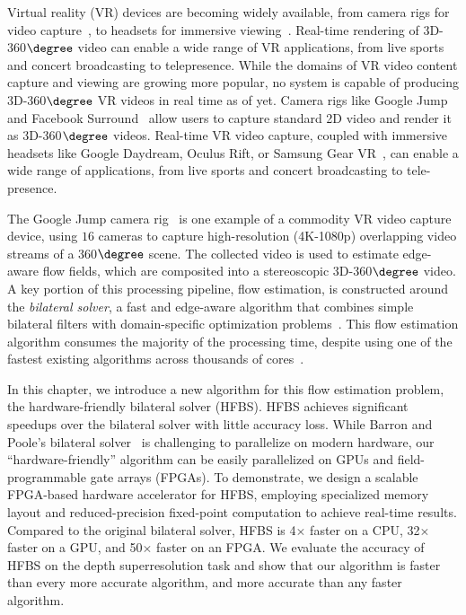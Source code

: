 Virtual reality (VR) devices are becoming widely available, from camera rigs for video capture~\cite{googlejump, facebooksurround}, to headsets for immersive viewing~\cite{oculusrift, gearvr}.
Real-time rendering of 3D-360$\degree$ video can enable a wide range of VR applications, from live sports and concert broadcasting to telepresence.
While the domains of VR video content capture and viewing are growing more popular, no system is capable of producing 3D-360$\degree$ VR videos in real time as of yet.
Camera rigs like Google Jump and Facebook Surround~\cite{googlejump} allow users to capture standard 2D video and render it as 3D-360$\degree$ videos. 
Real-time VR video capture, coupled with immersive headsets like Google Daydream, Oculus Rift, or Samsung Gear VR~\cite{googlecardboard, gearvr, oculusrift}, can enable a wide range of applications, from live sports and concert broadcasting to tele-presence.

The Google Jump camera rig~\cite{googlejump} is one example of a commodity VR video capture device, using $16$ cameras to capture high-resolution (4K-1080p) overlapping video streams of a 360$\degree$ scene. 
The collected video is used to estimate edge-aware flow fields, which are composited into a stereoscopic 3D-360$\degree$ video. 
A key portion of this processing pipeline, flow estimation, is constructed around the \emph{bilateral solver}, a fast and edge-aware algorithm that combines simple bilateral filters with domain-specific optimization problems~\cite{BarronPoole2016}. 
This flow estimation algorithm consumes the majority of the processing time, despite using one of the fastest existing algorithms across thousands of cores~\cite{googlejump}. 


In this chapter, we introduce a new algorithm for this flow estimation problem, the hardware-friendly bilateral solver (HFBS). 
HFBS achieves significant speedups over the bilateral solver with little accuracy loss.
While Barron and Poole's bilateral solver~\cite{BarronPoole2016} is challenging to parallelize on modern hardware, our ``hardware-friendly'' algorithm can be easily parallelized on GPUs and field-programmable gate arrays (FPGAs).
To demonstrate, we design a scalable FPGA-based hardware accelerator for HFBS, employing specialized memory layout and reduced-precision fixed-point computation to achieve real-time results.
Compared to the original bilateral solver, HFBS is 4$\times$ faster on a CPU, 32$\times$ faster on a GPU, and 50$\times$ faster on an FPGA.
We evaluate the accuracy of HFBS on the depth superresolution task and show that our algorithm is faster than every more accurate algorithm, and more accurate than any faster algorithm. 

